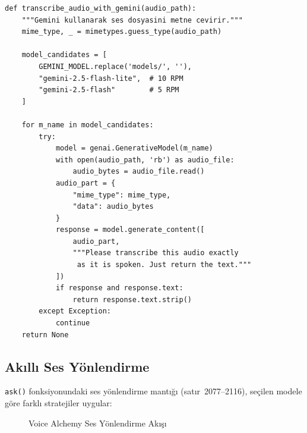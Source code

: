 \documentclass[12pt,a4paper]{article}
\begin{document}
\begin{lstlisting}[style=pythonstyle, caption={Gemini Tabanlı Ses Transkripsiyonu (app.py)}, label=lst:transcribe]
def transcribe_audio_with_gemini(audio_path):
    """Gemini kullanarak ses dosyasini metne cevirir."""
    mime_type, _ = mimetypes.guess_type(audio_path)
    
    model_candidates = [
        GEMINI_MODEL.replace('models/', ''),
        "gemini-2.5-flash-lite",  # 10 RPM
        "gemini-2.5-flash"        # 5 RPM
    ]
    
    for m_name in model_candidates:
        try:
            model = genai.GenerativeModel(m_name)
            with open(audio_path, 'rb') as audio_file:
                audio_bytes = audio_file.read()
            audio_part = {
                "mime_type": mime_type,
                "data": audio_bytes
            }
            response = model.generate_content([
                audio_part,
                """Please transcribe this audio exactly 
                 as it is spoken. Just return the text."""
            ])
            if response and response.text:
                return response.text.strip()
        except Exception:
            continue
    return None
\end{lstlisting}

\subsection{Akıllı Ses Yönlendirme}

\texttt{ask()} fonksiyonundaki ses yönlendirme mantığı (satır~2077--2116), seçilen modele göre farklı stratejiler uygular:

\begin{figure}[H]
\centering
{}
\caption{Voice Alchemy Ses Yönlendirme Akışı}
\label{fig:voice-flow}
\end{figure}
\end{document}
